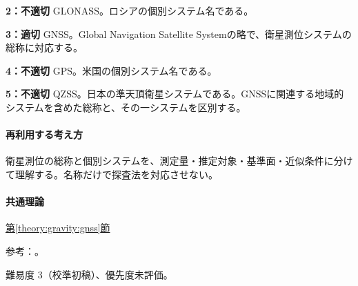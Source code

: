 \noindent\textbf{2：不適切} GLONASS。ロシアの個別システム名である。\par

\noindent\textbf{3：適切} GNSS。Global Navigation Satellite Systemの略で、衛星測位システムの総称に対応する。\par

\noindent\textbf{4：不適切} GPS。米国の個別システム名である。\par

\noindent\textbf{5：不適切} QZSS。日本の準天頂衛星システムである。GNSSに関連する地域的システムを含めた総称と、その一システムを区別する。\par

\paragraph{再利用する考え方} 衛星測位の総称と個別システムを、測定量・推定対象・基準面・近似条件に分けて理解する。名称だけで探査法を対応させない。

\paragraph{共通理論} \hyperref[theory:gravity:gnss]{第\ref*{theory:gravity:gnss}節}

\par 参考：\cite{gsi_gnss}。

\par 難易度 3（校準初稿）、優先度未評価。

